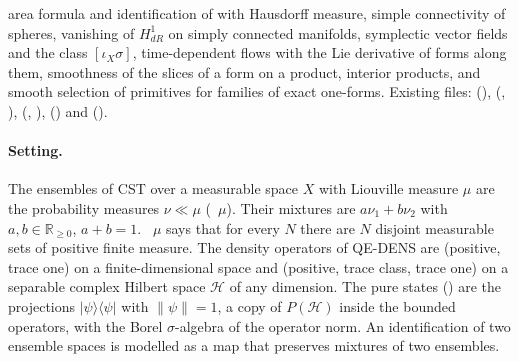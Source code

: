 \documentclass[11pt]{article}
\begin{document}
\begin{itemize}
  area formula and identification of  with Hausdorff measure, simple
  connectivity of spheres, vanishing of $H^1_{dR}$ on simply connected manifolds, symplectic
  vector fields and the class $[\iota_X\sigma]$, time-dependent flows with the Lie derivative
  of forms along them, smoothness of the slices of a form on a product, interior products, and
  smooth selection of primitives for families of exact one-forms.\newline
  Existing files: 
  (), 
  (, ), 
  (, ),
  () and
  ().
\end{itemize}

\paragraph{Setting.} The ensembles of CST over a measurable space $X$ with Liouville measure
$\mu$ are the probability measures $\nu \ll \mu$ (~$\mu$). Their mixtures
are $a\nu_1 + b\nu_2$ with $a, b \in \mathbb R_{\ge 0}$, $a + b = 1$.
~$\mu$ says that for every $N$ there are $N$ disjoint measurable sets of
positive finite measure. The density operators of QE-DENS are  (positive, trace
one) on a finite-dimensional space and  (positive, trace class, trace one)
on a separable complex Hilbert space $\mathcal H$ of any dimension. The pure states
() are the projections $|\psi\rangle\langle\psi|$ with $\|\psi\| = 1$, a copy
of $P(\mathcal H)$ inside the bounded operators, with the Borel $\sigma$-algebra of the operator
norm. An identification of two ensemble spaces is modelled as a map that preserves mixtures of two
ensembles.
\end{document}
